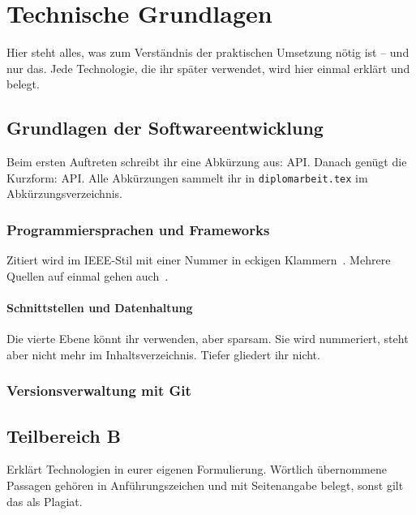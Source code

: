 \chapter{Technische Grundlagen}

Hier steht alles, was zum Verständnis der praktischen Umsetzung nötig ist --
und nur das. Jede Technologie, die ihr später verwendet, wird hier einmal
erklärt und belegt.

\section{Grundlagen der Softwareentwicklung}

Beim ersten Auftreten schreibt ihr eine Abkürzung aus: \ac{API}. Danach
genügt die Kurzform: \ac{API}. Alle Abkürzungen sammelt ihr in
\texttt{diplomarbeit.tex} im Abkürzungsverzeichnis.

\subsection{Programmiersprachen und Frameworks}

Zitiert wird im IEEE-Stil mit einer Nummer in eckigen
Klammern~\cite{beispiel-artikel}. Mehrere Quellen auf einmal gehen
auch~\cite{beispiel-buch,beispiel-online}.

\subsubsection{Schnittstellen und Datenhaltung}

Die vierte Ebene könnt ihr verwenden, aber sparsam. Sie wird nummeriert,
steht aber nicht mehr im Inhaltsverzeichnis. Tiefer gliedert ihr nicht.

\subsection{Versionsverwaltung mit Git}

\section{Teilbereich B}

Erklärt Technologien in eurer eigenen Formulierung. Wörtlich übernommene
Passagen gehören in Anführungszeichen und mit Seitenangabe belegt, sonst gilt
das als Plagiat.
